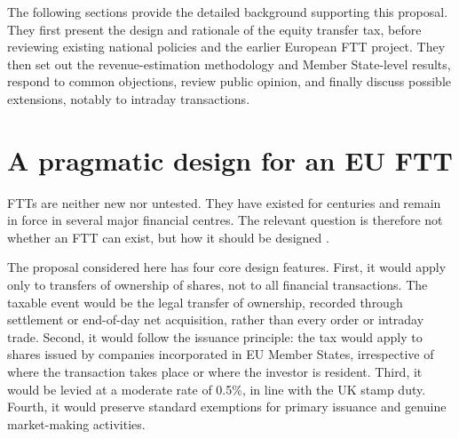 \documentclass[../../main]{subfiles}
\begin{document}
The following sections provide the detailed background supporting this proposal. They first present the design and rationale of the equity transfer tax, before reviewing existing national policies and the earlier European FTT project. They then set out the revenue-estimation methodology and Member State-level results, respond to common objections, review public opinion, and finally discuss possible extensions, notably to intraday transactions.






\section{A pragmatic design for an EU FTT}

FTTs are neither new nor untested. They have existed for centuries and remain in force in several major financial centres. The relevant question is therefore not whether an FTT can exist, but how it should be designed \citep{CapelleBlancard2024}.

The proposal considered here has four core design features. First, it would apply only to transfers of ownership of shares, not to all financial transactions. The taxable event would be the legal transfer of ownership, recorded through settlement or end-of-day net acquisition, rather than every order or intraday trade. Second, it would follow the issuance principle: the tax would apply to shares issued by companies incorporated in EU Member States, irrespective of where the transaction takes place or where the investor is resident. Third, it would be levied at a moderate rate of 0.5\%, in line with the UK stamp duty. Fourth, it would preserve standard exemptions for primary issuance and genuine market-making activities.
\end{document}
